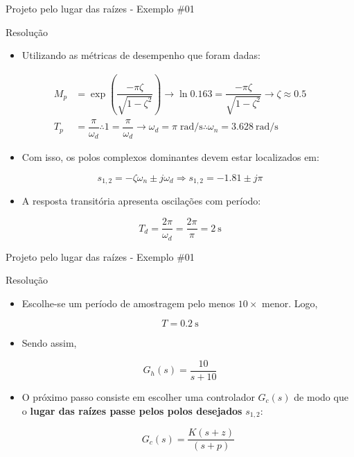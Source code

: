 \begin{frame}{Projeto pelo lugar das raízes - Exemplo \#01}
\begin{block}{Resolução}
\begin{itemize}
    \item Utilizando as métricas de desempenho que foram dadas:
\end{itemize}
	\begin{align*}
		M_p&=\exp{\left( \dfrac{-\pi\zeta}{\sqrt{1-\zeta^{2}}}\right) }\rightarrow \ln\num{0,163}=\dfrac{-\pi\zeta}{\sqrt{1-\zeta^{2}}}\rightarrow\zeta\approx\num{0,5}\\
		T_p&=\dfrac{\pi}{\omega_d}\therefore 1=\dfrac{\pi}{\omega_d}\rightarrow\omega_d=\pi\;\si{\radian\per\second}\therefore\omega_n=\SI{3,628}{\radian\per\second}
	\end{align*}
\begin{itemize}
    \item Com isso, os polos complexos dominantes devem estar localizados em:
\end{itemize}
	
	\[ s_{1,2}=-\zeta\omega_n\pm j\omega_d\Rightarrow s_{1,2}=-\num{1,81}\pm j\pi \]

\begin{itemize}
    \item A resposta transitória apresenta oscilações com período:
\end{itemize}

	\[ T_d=\dfrac{2\pi}{\omega_d}=\dfrac{2\pi}{\pi}=\SI{2}{\second} \]
\end{block}
\end{frame}


\begin{frame}{Projeto pelo lugar das raízes - Exemplo \#01}
\begin{block}{Resolução}
\begin{itemize}
    \item Escolhe-se um período de amostragem pelo menos $ 10\times $ menor. Logo,
\end{itemize}
	 
	\[ T=\SI{0,2}{\second} \]
	
	\smallskip
	
\begin{itemize}
    \item Sendo assim,
\end{itemize}
	
	\[ G_h(s)=\dfrac{10}{s+10} \]
	
	\begin{itemize}
		\item O próximo passo consiste em escolher uma controlador $ G_c(s) $ de modo que o \textbf{lugar das raízes passe pelos polos desejados} $ s_{1,2} $:
		
		\[ G_c(s)=\dfrac{K(s+z)}{(s+p)} \]
	\end{itemize}
\end{block}
\end{frame}

